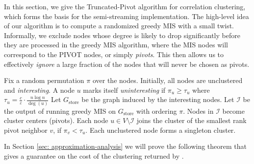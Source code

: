 \documentclass{theoretics}
\newcommand{\pivot}{\textrm{PIVOT}\xspace}
\newcommand{\truncatedpivot}{\textrm{Truncated-Pivot}\xspace}
\newcommand{\eps}{\ensuremath{\varepsilon}}
\newcommand{\gstore}{\ensuremath{G_\mathrm{store}}\xspace}
\begin{document}
In this section, we give the \truncatedpivot algorithm for correlation clustering, which forms the basis for the semi-streaming implementation. 
The high-level idea of our algorithm is to compute a randomized greedy MIS with a small twist. 
Informally, we exclude nodes whose degree is likely to drop significantly before they are processed in the greedy MIS algorithm, where the MIS nodes will correspond to the \pivot nodes, or simply \emph{pivots}. 
This then allows us to effectively \emph{ignore} a large fraction of the nodes that will never be chosen as pivots.


\begin{algorithm}[tbh]
\caption{\truncatedpivot}\label{alg:delta-pivot}

     Fix a random permutation $\pi$ over the nodes.\;
     Initially, all nodes are unclustered and \emph{interesting}.\;
     A node $u$ marks itself \emph{uninteresting} if $\pi_{u} \geq \tau_{u}$ where $\tau_{u} = \frac{c}{\eps}\cdot \frac{n\log n}{\deg(u)}$ \label{line: interesting}\;
     Let \gstore be the graph induced by the interesting nodes.\label{line: gstore}\;
     Let $\mathcal{I}$ be the output of running greedy MIS on $\gstore$ with ordering $\pi$. \label{line:greedy-mis-prefix}\;
     Nodes in $\mathcal{I}$ become cluster centers (pivots). \label{line:pivot}\;
     Each node $u \in V \setminus \mathcal{I}$ joins the cluster of the smallest rank pivot neighbor $v$, if $\pi_v < \tau_u$.\label{line:cluster-pivot-nbrs}\;
     Each unclustered node forms a singleton cluster.\label{line: singleton}\;

\end{algorithm} 
In Section \ref{sec: approximation-analysis} we will prove the following theorem that gives a guarantee on the cost of the clustering returned by .
\end{document}
